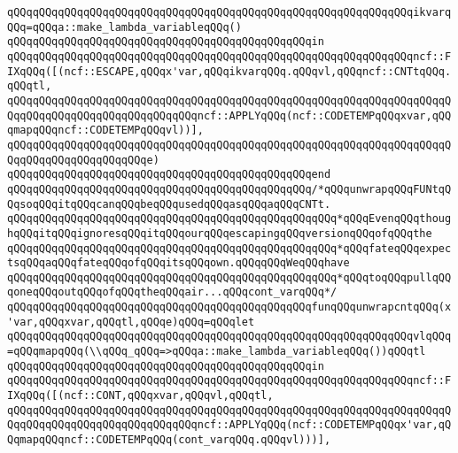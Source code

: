 \verb|qQQqqQQqqQQqqQQqqQQqqQQqqQQqqQQqqQQqqQQqqQQqqQQqqQQqqQQqqQQqqQQqikvarqQQq=qQQqa::make_lambda_variableqQQq()|\newline
\verb|qQQqqQQqqQQqqQQqqQQqqQQqqQQqqQQqqQQqqQQqqQQqqQQqin|\newline
\verb|qQQqqQQqqQQqqQQqqQQqqQQqqQQqqQQqqQQqqQQqqQQqqQQqqQQqqQQqqQQqqQQqncf::FIXqQQq([(ncf::ESCAPE,qQQqx'var,qQQqikvarqQQq.qQQqvl,qQQqncf::CNTtqQQq.qQQqtl,|\newline
\verb|qQQqqQQqqQQqqQQqqQQqqQQqqQQqqQQqqQQqqQQqqQQqqQQqqQQqqQQqqQQqqQQqqQQqqQQqqQQqqQQqqQQqqQQqqQQqqQQqqQQqncf::APPLYqQQq(ncf::CODETEMPqQQqxvar,qQQqmapqQQqncf::CODETEMPqQQqvl))],|\newline
\verb|qQQqqQQqqQQqqQQqqQQqqQQqqQQqqQQqqQQqqQQqqQQqqQQqqQQqqQQqqQQqqQQqqQQqqQQqqQQqqQQqqQQqqQQqqQQqe)|\newline
\verb|qQQqqQQqqQQqqQQqqQQqqQQqqQQqqQQqqQQqqQQqqQQqqQQqend|\newline
\newline
\verb|qQQqqQQqqQQqqQQqqQQqqQQqqQQqqQQqqQQqqQQqqQQqqQQq/*qQQqunwrapqQQqFUNtqQQqsoqQQqitqQQqcanqQQqbeqQQqusedqQQqasqQQqaqQQqCNTt.|\newline
\verb|qQQqqQQqqQQqqQQqqQQqqQQqqQQqqQQqqQQqqQQqqQQqqQQqqQQq*qQQqEvenqQQqthoughqQQqitqQQqignoresqQQqitqQQqourqQQqescapingqQQqversionqQQqofqQQqthe|\newline
\verb|qQQqqQQqqQQqqQQqqQQqqQQqqQQqqQQqqQQqqQQqqQQqqQQqqQQq*qQQqfateqQQqexpectsqQQqaqQQqfateqQQqofqQQqitsqQQqown.qQQqqQQqWeqQQqhave|\newline
\verb|qQQqqQQqqQQqqQQqqQQqqQQqqQQqqQQqqQQqqQQqqQQqqQQqqQQq*qQQqtoqQQqpullqQQqoneqQQqoutqQQqofqQQqtheqQQqair...qQQqcont_varqQQq*/|\newline
\verb|qQQqqQQqqQQqqQQqqQQqqQQqqQQqqQQqqQQqqQQqqQQqqQQqfunqQQqunwrapcntqQQq(x'var,qQQqxvar,qQQqtl,qQQqe)qQQq=qQQqlet|\newline
\verb|qQQqqQQqqQQqqQQqqQQqqQQqqQQqqQQqqQQqqQQqqQQqqQQqqQQqqQQqqQQqqQQqvlqQQq=qQQqmapqQQq(\\qQQq_qQQq=>qQQqa::make_lambda_variableqQQq())qQQqtl|\newline
\verb|qQQqqQQqqQQqqQQqqQQqqQQqqQQqqQQqqQQqqQQqqQQqqQQqin|\newline
\verb|qQQqqQQqqQQqqQQqqQQqqQQqqQQqqQQqqQQqqQQqqQQqqQQqqQQqqQQqqQQqqQQqncf::FIXqQQq([(ncf::CONT,qQQqxvar,qQQqvl,qQQqtl,|\newline
\verb|qQQqqQQqqQQqqQQqqQQqqQQqqQQqqQQqqQQqqQQqqQQqqQQqqQQqqQQqqQQqqQQqqQQqqQQqqQQqqQQqqQQqqQQqqQQqqQQqqQQqncf::APPLYqQQq(ncf::CODETEMPqQQqx'var,qQQqmapqQQqncf::CODETEMPqQQq(cont_varqQQq.qQQqvl)))],|\newline
